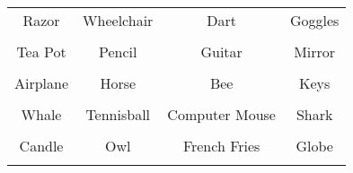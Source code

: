 \documentclass[12pt,a4paper]{article}
\begin{document}
\thispagestyle{empty}
\begin{table}[]
\centering
\Huge
\begin{tabular}{cccc}
 Razor& Wheelchair& Dart& Goggles\\  & & & \\
 Tea Pot& Pencil& Guitar& Mirror\\  & & & \\
 Airplane& Horse& Bee& Keys\\  & & & \\
 Whale& Tennisball& Computer Mouse& Shark\\  & & & \\
 Candle& Owl& French Fries& Globe\\  & & & \\
\end{tabular}
\end{table}
\end{document}
